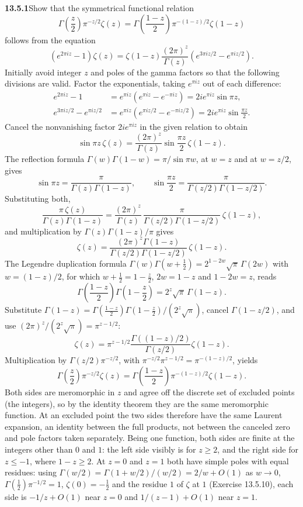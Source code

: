 \par\bigskip
\noindent\textbf{13.5.1}\quad Show that the symmetrical functional relation
\[
\Gamma\left(\frac{z}{2}\right)\pi^{-z/2}\zeta(z)
=\Gamma\left(\frac{1-z}{2}\right)\pi^{-(1-z)/2}\zeta(1-z)
\]
follows from the equation
\[
\left(e^{2\pi iz}-1\right)\zeta(z)
=\zeta(1-z)\frac{(2\pi)^{z}}{\Gamma(z)}
\left(e^{3\pi iz/2}-e^{\pi iz/2}\right).
\]
\solution
Initially avoid integer $z$ and poles of the gamma factors so
that the following divisions are valid.  Factor the exponentials,
taking $e^{\pi iz}$ out of each difference:
\begin{align*}
e^{2\pi iz}-1&=e^{\pi iz}\left(e^{\pi iz}-e^{-\pi iz}\right)
=2ie^{\pi iz}\sin\pi z,\\
e^{3\pi iz/2}-e^{\pi iz/2}&=e^{\pi iz}\left(e^{\pi iz/2}-e^{-\pi iz/2}\right)
=2ie^{\pi iz}\sin\frac{\pi z}{2}.
\end{align*}
Cancel the nonvanishing factor $2ie^{\pi iz}$ in the given relation to obtain
\[
\sin\pi z\,\zeta(z)=
\frac{(2\pi)^z}{\Gamma(z)}\sin\frac{\pi z}{2}\,\zeta(1-z).
\]
The reflection formula $\Gamma(w)\Gamma(1-w)=\pi/\sin\pi w$,
at $w=z$ and at $w=z/2$, gives
\[
\sin\pi z=\frac\pi{\Gamma(z)\Gamma(1-z)},\qquad
\sin\frac{\pi z}{2}=\frac\pi{\Gamma(z/2)\Gamma(1-z/2)}.
\]
Substituting both,
\[
\frac{\pi\,\zeta(z)}{\Gamma(z)\Gamma(1-z)}
=\frac{(2\pi)^z}{\Gamma(z)}\,
\frac{\pi}{\Gamma(z/2)\Gamma(1-z/2)}\,\zeta(1-z),
\]
and multiplication by $\Gamma(z)\Gamma(1-z)/\pi$ gives
\[
\zeta(z)=\frac{(2\pi)^z\Gamma(1-z)}
{\Gamma(z/2)\Gamma(1-z/2)}\,\zeta(1-z).
\]
The Legendre duplication formula
$\Gamma(w)\Gamma(w+\frac12)=2^{1-2w}\sqrt\pi\,\Gamma(2w)$ with
$w=(1-z)/2$, for which $w+\frac12=1-\frac z2$, $2w=1-z$ and
$1-2w=z$, reads
\[
\Gamma\left(\frac{1-z}{2}\right)\Gamma\left(1-\frac z2\right)
=2^z\sqrt\pi\,\Gamma(1-z).
\]
Substitute $\Gamma(1-z)=\Gamma(\frac{1-z}2)\Gamma(1-\frac z2)/(2^z\sqrt\pi)$,
cancel $\Gamma(1-z/2)$, and use $(2\pi)^z/(2^z\sqrt\pi)=\pi^{z-1/2}$:
\[
\zeta(z)=\pi^{z-1/2}
\frac{\Gamma((1-z)/2)}{\Gamma(z/2)}\zeta(1-z).
\]
Multiplication by $\Gamma(z/2)\pi^{-z/2}$, with
$\pi^{-z/2}\pi^{z-1/2}=\pi^{-(1-z)/2}$, yields
\[
\boxed{\Gamma\left(\frac z2\right)\pi^{-z/2}\zeta(z)
=\Gamma\left(\frac{1-z}{2}\right)\pi^{-(1-z)/2}\zeta(1-z)}.
\]
Both sides are meromorphic in $z$ and agree off the discrete
set of excluded points (the integers), so by the identity theorem
they are the same meromorphic function.  At an excluded point the
two sides therefore have the same Laurent expansion, an identity
between the full products, not between the canceled zero and pole
factors taken separately.  Being one function, both sides are
finite at the integers other than $0$ and $1$: the left side
visibly is for $z\ge2$, and the right side for $z\le-1$, where
$1-z\ge2$.  At $z=0$ and $z=1$ both have simple poles with
equal residues: using
$\Gamma(w/2)=\Gamma(1+w/2)/(w/2)=2/w+O(1)$ as $w\to0$,
$\Gamma(\frac12)\pi^{-1/2}=1$, $\zeta(0)=-\frac12$ and the
residue $1$ of $\zeta$ at $1$ (Exercise 13.5.10), each side is
$-1/z+O(1)$ near $z=0$ and $1/(z-1)+O(1)$ near $z=1$.



